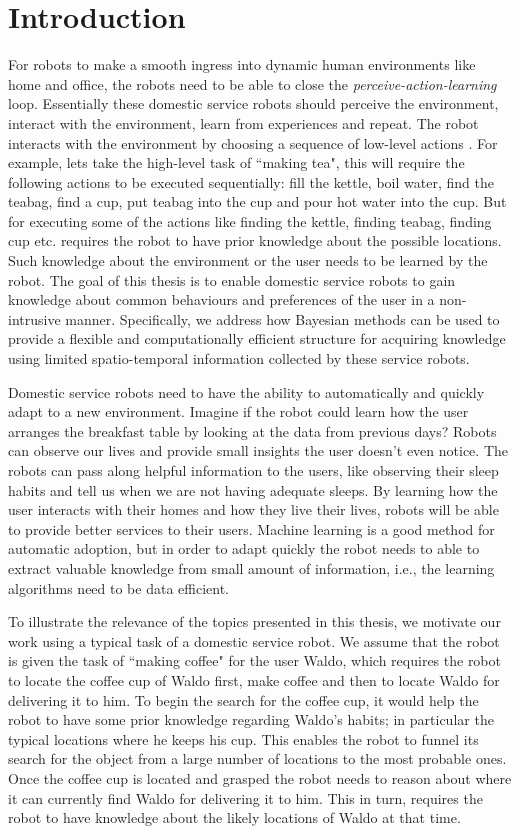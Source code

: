 \chapter{Introduction}


For robots to make a smooth ingress into dynamic human environments like home and office, the robots need to be able to close the \emph{perceive-action-learning} loop. Essentially these domestic service robots should perceive the environment, interact with the environment, learn from experiences and repeat. The robot interacts with the environment by choosing a sequence of low-level actions . For example, lets take the high-level task of ``making tea", this will require the following actions to be executed sequentially: fill the kettle, boil water, find the teabag, find a cup, put teabag into the cup and pour hot water into the cup. But for executing some of the actions like finding the kettle, finding teabag, finding cup etc. requires the robot to have prior knowledge about the possible locations. Such knowledge about the environment or the user needs to be learned by the robot. The goal of this thesis is to enable domestic service robots to gain knowledge about common behaviours and preferences of the user in a non-intrusive manner. Specifically, we address how Bayesian methods can be used to provide a flexible and computationally efficient structure for acquiring knowledge using limited spatio-temporal information collected by these service robots.

Domestic service robots need to have the ability to automatically and quickly adapt to a new environment. Imagine if the robot could learn how the user arranges the breakfast table by looking at the data from previous days? Robots can observe our lives and provide small insights the user doesn’t even notice. The robots can pass along helpful information to the users, like observing their sleep habits and tell us when we are not having adequate sleeps. By learning how the user interacts with their homes and how they live their lives, robots will be able to provide better services to their users. Machine learning is a good method for automatic adoption, but in order to adapt quickly the robot needs to able to extract valuable knowledge from small amount of information, i.e., the learning algorithms need to be data efficient.

To illustrate the relevance of the topics presented in this thesis, we motivate our work using a typical task of a domestic service robot.   We assume that the robot is given the task of ``making coffee" for the user Waldo, which requires the robot to locate the coffee cup of Waldo first, make coffee and then to locate Waldo for delivering it to him. To begin the search for the coffee cup, it would help the robot to have some prior knowledge regarding Waldo's habits; in particular the typical locations where he keeps his cup. This enables the robot to funnel its search for the object from a large number of locations to the most probable ones. Once the coffee cup is located and grasped the robot needs to reason about where it can currently find Waldo for delivering it to him. This in turn, requires the robot to have knowledge about the likely locations of Waldo at that time.

